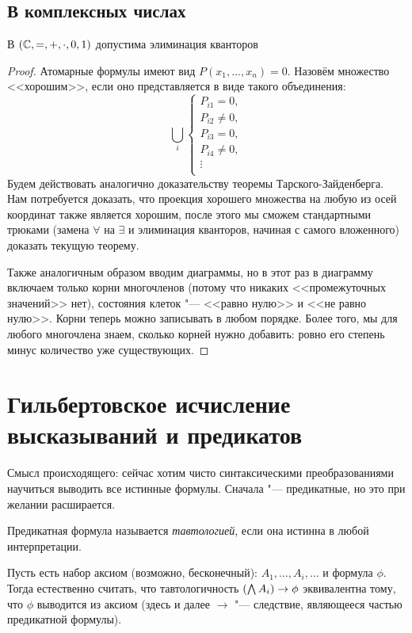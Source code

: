 \subsection{В комплексных числах}
\begin{theorem}
	В $(\mathbb{C}, =, +, \cdot, 0, 1)$ допустима элиминация кванторов
\end{theorem}
\begin{proof}
	Атомарные формулы имеют вид $P(x_1, \dots, x_n)=0$.
	Назовём множество <<хорошим>>, если оно представляется в виде такого объединения:
	\[
		\bigcup_i
			\begin{cases}
				P_{i1} = 0, \\
				P_{i2} \neq 0, \\
				P_{i3} = 0, \\
				P_{i4} \neq 0, \\
				\vdots \\
			\end{cases}
	\]
	Будем действовать аналогично доказательству теоремы Тарского-Зайденберга.
	Нам потребуется доказать, что проекция хорошего множества на любую из осей координат также является хорошим,
	после этого мы сможем стандартными трюками (замена $\forall$ на $\exists$ и элиминация кванторов, начиная с самого вложенного)
	доказать текущую теорему.

	Также аналогичным образом вводим диаграммы, но в этот раз в диаграмму включаем только корни многочленов (потому что никаких <<промежуточных значений>> нет),
	состояния клеток "--- <<равно нулю>> и <<не равно нулю>>.
	Корни теперь можно записывать в любом порядке.
	Более того, мы для любого многочлена знаем, сколько корней нужно добавить: ровно его степень минус количество уже существующих.
\end{proof}

\section{Гильбертовское исчисление высказываний и предикатов}
Смысл происходящего: сейчас хотим чисто синтаксическими преобразованиями научиться выводить все истинные формулы.
Сначала "--- предикатные, но это при желании расширается.

\begin{Def}
	Предикатная формула называется \textsl{тавтологией}, если она истинна в любой интерпретации.
\end{Def}
\begin{Rem} %
	Пусть есть набор аксиом (возможно, бесконечный): $A_1, \dots, A_i, \dots$ и формула $\phi$.
	Тогда естественно считать, что тавтологичность $(\bigwedge A_i) \to \phi$ эквивалентна тому, что $\phi$ выводится из аксиом (здесь и далее $\to$ "--- следствие, являющееся частью предикатной формулы).
\end{Rem}

